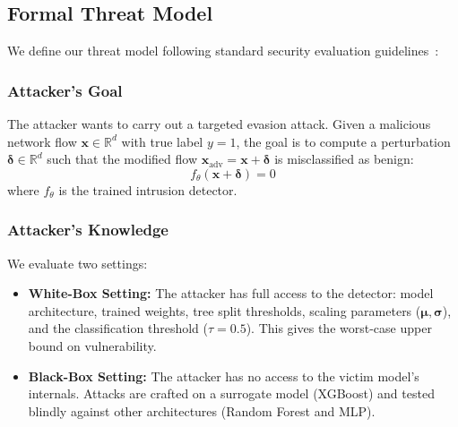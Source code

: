 \documentclass[final,5p,times,twocolumn]{elsarticle}
\begin{document}
\subsection{Formal Threat Model}
\label{sec:threat_model}
We define our threat model following standard security evaluation guidelines~\cite{papernot2016transferability,carlini2017evaluating}:

\subsubsection{Attacker's Goal}
The attacker wants to carry out a targeted evasion attack. Given a malicious network flow $\mathbf{x} \in \mathbb{R}^d$ with true label $y = 1$, the goal is to compute a perturbation $\boldsymbol{\delta} \in \mathbb{R}^d$ such that the modified flow $\mathbf{x}_{\text{adv}} = \mathbf{x} + \boldsymbol{\delta}$ is misclassified as benign:
\begin{equation}
    f_\theta(\mathbf{x} + \boldsymbol{\delta}) = 0
\end{equation}
where $f_\theta$ is the trained intrusion detector.

\subsubsection{Attacker's Knowledge}
We evaluate two settings:
\begin{itemize}
    \item \textbf{White-Box Setting:} The attacker has full access to the detector: model architecture, trained weights, tree split thresholds, scaling parameters ($\boldsymbol{\mu}, \boldsymbol{\sigma}$), and the classification threshold ($\tau = 0.5$). This gives the worst-case upper bound on vulnerability.
    \item \textbf{Black-Box Setting:} The attacker has no access to the victim model's internals. Attacks are crafted on a surrogate model (XGBoost) and tested blindly against other architectures (Random Forest and MLP).
\end{itemize}
\end{document}
